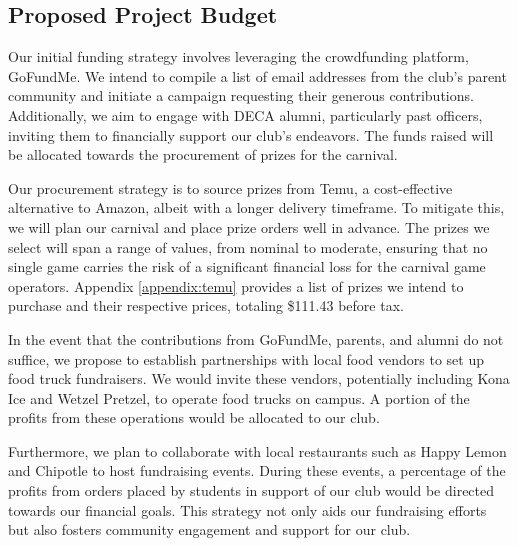 \subsection{Proposed Project Budget}

Our initial funding strategy involves leveraging the crowdfunding platform, GoFundMe. We intend to compile a list of email addresses from the club's parent community and initiate a campaign requesting their generous contributions. Additionally, we aim to engage with DECA alumni, particularly past officers, inviting them to financially support our club's endeavors. The funds raised will be allocated towards the procurement of prizes for the carnival.

Our procurement strategy is to source prizes from Temu, a cost-effective alternative to Amazon, albeit with a longer delivery timeframe. To mitigate this, we will plan our carnival and place prize orders well in advance. The prizes we select will span a range of values, from nominal to moderate, ensuring that no single game carries the risk of a significant financial loss for the carnival game operators. Appendix \ref{appendix:temu} provides a list of prizes we intend to purchase and their respective prices, totaling \$111.43 before tax.

In the event that the contributions from GoFundMe, parents, and alumni do not suffice, we propose to establish partnerships with local food vendors to set up food truck fundraisers. We would invite these vendors, potentially including Kona Ice and Wetzel Pretzel, to operate food trucks on campus. A portion of the profits from these operations would be allocated to our club.

Furthermore, we plan to collaborate with local restaurants such as Happy Lemon and Chipotle to host fundraising events. During these events, a percentage of the profits from orders placed by students in support of our club would be directed towards our financial goals. This strategy not only aids our fundraising efforts but also fosters community engagement and support for our club.
